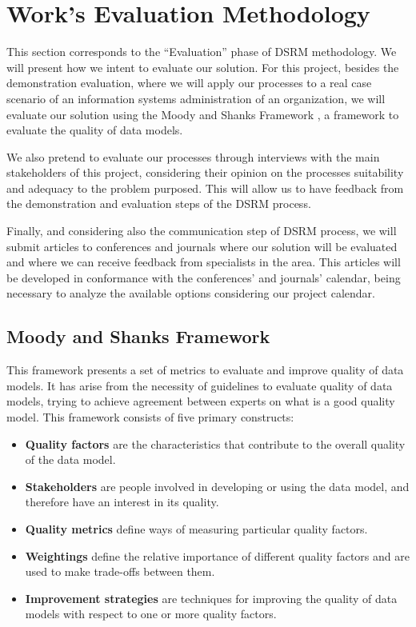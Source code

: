 
% 
% 

\section{Work's Evaluation Methodology}

This section corresponds to the ``Evaluation'' phase of DSRM methodology. We will present how we intent to evaluate our solution. For this project, besides the demonstration evaluation, where we will apply our processes to a real case scenario of an information systems administration of an organization, we will evaluate our solution using the Moody and Shanks Framework \cite{moody2003improving}, a framework to evaluate the quality of data models.\par
We also pretend to evaluate our processes through interviews with the main stakeholders of this project, considering their opinion on the processes suitability and adequacy to the problem purposed. This will allow us to have feedback from the demonstration and evaluation steps of the DSRM process.\par
Finally, and considering also the communication step of DSRM process, we will submit articles to conferences and journals where our solution will be evaluated and where we can receive feedback from specialists in the area. This articles will be developed in conformance with the conferences' and journals' calendar, being necessary to analyze the available options considering our project calendar.\par

\subsection{Moody and Shanks Framework}

This framework presents a set of metrics to evaluate and improve quality of data models. It has arise from the necessity of guidelines to evaluate quality of data models, trying to achieve agreement between experts on what is a good quality model. This framework consists of five primary constructs:

\begin{itemize}
\item \textbf{Quality factors} are the characteristics that contribute to the overall quality of the data model.
\item \textbf{Stakeholders} are people involved in developing or using the data model, and therefore have an interest in its quality.
\item \textbf{Quality metrics} define ways of measuring particular quality factors.
\item \textbf{Weightings} define the relative importance of different quality factors and are used to make trade-offs between them.
\item \textbf{Improvement strategies} are techniques for improving the quality of data models with respect to one or more quality factors.
\end{itemize}

